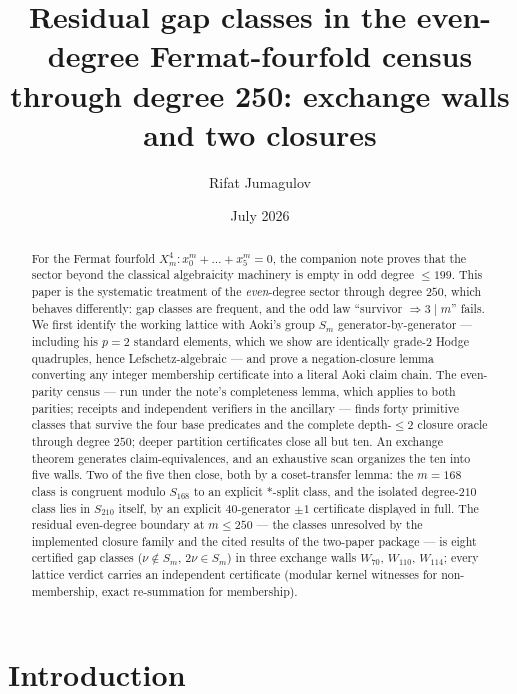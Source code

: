 \documentclass[11pt]{amsart}
\title[Even-degree Fermat gap classes]{Residual gap classes in the even-degree Fermat-fourfold
census through degree 250: exchange walls and two closures}
\author{Rifat Jumagulov}
\date{July 2026}
\theoremstyle{remark}
\begin{document}
\raggedbottom
\begin{abstract}
For the Fermat fourfold $X^4_m\colon x_0^m+\dots+x_5^m=0$, the companion note \cite{BN} proves
that the sector beyond the classical algebraicity machinery is empty in odd degree $\le199$.
This paper is the systematic treatment of the \emph{even}-degree sector through degree $250$,
which behaves differently: gap classes are frequent, and the odd law ``survivor
$\Rightarrow3\mid m$'' fails. We first identify the working lattice with Aoki's group $S_m$ generator-by-generator ---
including his $p=2$ standard elements, which we show are identically grade-$2$ Hodge quadruples,
hence Lefschetz-algebraic --- and prove a negation-closure lemma converting any integer
membership certificate into a literal Aoki claim chain. The even-parity census --- run under the
note's completeness lemma, which applies to both parities; receipts and independent verifiers in
the ancillary --- finds
forty primitive classes that survive the four base predicates and the complete depth-$\le2$
closure oracle through degree $250$; deeper partition certificates close all but ten. An exchange
theorem generates claim-equivalences, and an exhaustive scan organizes the ten into five walls.
Two of the five then close, both by a coset-transfer lemma: the $m=168$ class is congruent modulo
$S_{168}$ to an explicit $*$-split class, and the isolated degree-$210$ class lies in $S_{210}$
itself, by an explicit $40$-generator $\pm1$ certificate displayed in full. The residual even-degree boundary at $m\le250$ --- the classes unresolved by the
implemented closure family and the cited results of the two-paper package --- is eight certified gap classes
($\nu\notin S_m$,
$2\nu\in S_m$) in three exchange walls $W_{70}$, $W_{110}$, $W_{114}$; every lattice verdict
carries an independent certificate (modular kernel witnesses for non-membership, exact
re-summation for membership).
\end{abstract}
\maketitle

\section{Introduction}\label{sec:intro}
\end{document}
